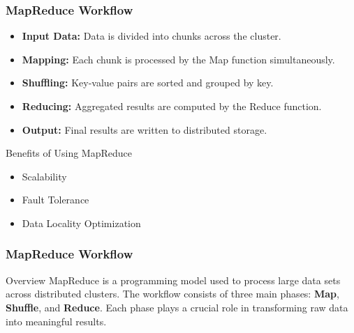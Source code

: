 \documentclass[aspectratio=169]{beamer}
\begin{document}
\begin{frame}[fragile]
    \frametitle{MapReduce Workflow}
    \begin{itemize}
        \item \textbf{Input Data:} Data is divided into chunks across the cluster.
        \item \textbf{Mapping:} Each chunk is processed by the Map function simultaneously.
        \item \textbf{Shuffling:} Key-value pairs are sorted and grouped by key.
        \item \textbf{Reducing:} Aggregated results are computed by the Reduce function.
        \item \textbf{Output:} Final results are written to distributed storage.
    \end{itemize}
    \begin{block}{Benefits of Using MapReduce}
        \begin{itemize}
            \item Scalability
            \item Fault Tolerance
            \item Data Locality Optimization
        \end{itemize}
    \end{block}
\end{frame}

\begin{frame}[fragile]
    \frametitle{MapReduce Workflow}
    \begin{block}{Overview}
        MapReduce is a programming model used to process large data sets across distributed clusters. 
        The workflow consists of three main phases: \textbf{Map}, \textbf{Shuffle}, and \textbf{Reduce}. 
        Each phase plays a crucial role in transforming raw data into meaningful results.
    \end{block}
\end{frame}
\end{document}

